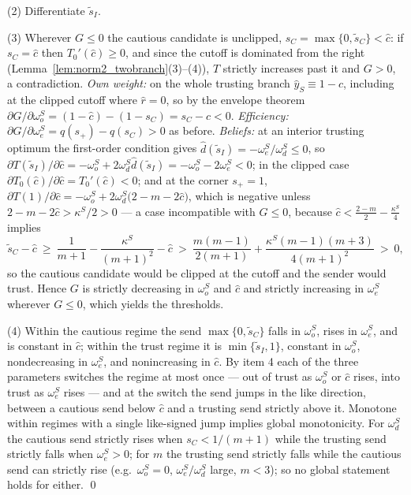\documentclass[11pt]{article}
\theoremstyle{plain}
\theoremstyle{remark}
\begin{document}
(2) Differentiate $\tilde s_I$.

(3) Wherever $G\le0$ the cautious candidate is unclipped, $s_C=\max\{0,\tilde s_C\}<\hat c$: if $s_C=\hat c$ then $T_0'(\hat c)\ge0$, and since the cutoff is dominated from the right (Lemma~\ref{lem:norm2_twobranch}(3)--(4)), $T$ strictly increases past it and $G>0$, a contradiction.  \emph{Own weight:} on the whole trusting branch $\hat y_S\equiv1-\hat c$, including at the clipped cutoff where $\hat r=0$, so by the envelope theorem $\partial G/\partial\omega_o^S=(1-\hat c)-(1-s_C)=s_C-\hat c<0$.  \emph{Efficiency:} $\partial G/\partial\omega_e^S=q(s_+)-q(s_C)>0$ as before.  \emph{Beliefs:} at an interior trusting optimum the first-order condition gives $\hat d(\tilde s_I)=-\omega_e^S/\omega_d^S\le0$, so $\partial T(\tilde s_I)/\partial\hat c=-\omega_o^S+2\omega_d^S\hat d(\tilde s_I)=-\omega_o^S-2\omega_e^S<0$; in the clipped case $\partial T_0(\hat c)/\partial\hat c=T_0'(\hat c)<0$; and at the corner $s_+=1$, $\partial T(1)/\partial\hat c=-\omega_o^S+2\omega_d^S\big(2-m-2\hat c\big)$, which is negative unless $2-m-2\hat c>\kappa^S/2>0$ --- a case incompatible with $G\le0$, because $\hat c<\tfrac{2-m}2-\tfrac{\kappa^S}4$ implies
\[
        \tilde s_C-\hat c
        \ \ge\ \frac1{m+1}-\frac{\kappa^S}{(m+1)^2}-\hat c
        \ >\ \frac{m(m-1)}{2(m+1)}+\frac{\kappa^S(m-1)(m+3)}{4(m+1)^2}
        \ >\ 0 ,
\]
so the cautious candidate would be clipped at the cutoff and the sender would trust.  Hence $G$ is strictly decreasing in $\omega_o^S$ and $\hat c$ and strictly increasing in $\omega_e^S$ wherever $G\le0$, which yields the thresholds.

(4) Within the cautious regime the send $\max\{0,\tilde s_C\}$ falls in $\omega_o^S$, rises in $\omega_e^S$, and is constant in $\hat c$; within the trust regime it is $\min\{\tilde s_I,1\}$, constant in $\omega_o^S$, nondecreasing in $\omega_e^S$, and nonincreasing in $\hat c$.  By item 4 each of the three parameters switches the regime at most once --- out of trust as $\omega_o^S$ or $\hat c$ rises, into trust as $\omega_e^S$ rises --- and at the switch the send jumps in the like direction, between a cautious send below $\hat c$ and a trusting send strictly above it.  Monotone within regimes with a single like-signed jump implies global monotonicity.  For $\omega_d^S$ the cautious send strictly rises when $s_C<1/(m+1)$ while the trusting send strictly falls when $\omega_e^S>0$; for $m$ the trusting send strictly falls while the cautious send can strictly rise (e.g.\ $\omega_o^S=0$, $\omega_e^S/\omega_d^S$ large, $m<3$); so no global statement holds for either.
\qed
\end{document}
